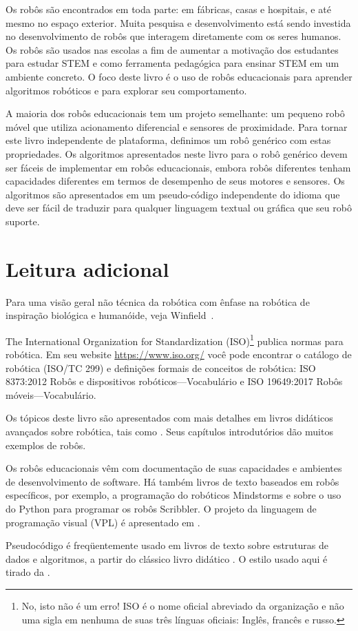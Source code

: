 Os robôs são encontrados em toda parte: em fábricas, casas e hospitais, e até mesmo no espaço exterior. Muita pesquisa e desenvolvimento está sendo investida no desenvolvimento de robôs que interagem diretamente com os seres humanos. Os robôs são usados nas escolas a fim de aumentar a motivação dos estudantes para estudar STEM e como ferramenta pedagógica para ensinar STEM em um ambiente concreto. O foco deste livro é o uso de robôs educacionais para aprender algoritmos robóticos e para explorar seu comportamento.

A maioria dos robôs educacionais tem um projeto semelhante: um pequeno robô móvel que utiliza acionamento diferencial e sensores de proximidade. Para tornar este livro independente de plataforma, definimos um robô genérico com estas propriedades. Os algoritmos apresentados neste livro para o robô genérico devem ser fáceis de implementar em robôs educacionais, embora robôs diferentes tenham capacidades diferentes em termos de desempenho de seus motores e sensores. Os algoritmos são apresentados em um pseudo-código independente do idioma que deve ser fácil de traduzir para qualquer linguagem textual ou gráfica que seu robô suporte.

\section{Leitura adicional}

Para uma visão geral não técnica da robótica com ênfase na robótica de inspiração biológica e humanóide, veja Winfield~\cite{vsi}.

The International Organization for Standardization (ISO)\footnote{No, isto não é um erro! ISO é o nome oficial abreviado da organização e não uma sigla em nenhuma de suas três línguas oficiais: Inglês, francês e russo.} publica normas para robótica. Em seu website \url{https://www.iso.org/} você pode encontrar o catálogo de robótica (ISO/TC 299) e definições formais de conceitos de robótica: ISO 8373:2012 Robôs e dispositivos robóticos---Vocabulário e ISO 19649:2017 Robôs móveis---Vocabulário.

Os tópicos deste livro são apresentados com mais detalhes em livros didáticos avançados sobre robótica, tais como \cite{dudek,siegwart}. Seus capítulos introdutórios dão muitos exemplos de robôs.

Os robôs educacionais vêm com documentação de suas capacidades e ambientes de desenvolvimento de software. Há também livros de texto baseados em robôs específicos, por exemplo, \cite{trobaugh} a programação do \lego{}  robóticos Mindstorms e \cite{kumar} sobre o uso do Python para programar os robôs Scribbler. O projeto da linguagem de programação visual (VPL) é apresentado em \cite{shin2014idc}.

Pseudocódigo é freqüentemente usado em livros de texto sobre estruturas de dados e algoritmos, a partir do clássico livro didático \cite{aho}. O estilo usado aqui é tirado da \cite{pcdp2}.

